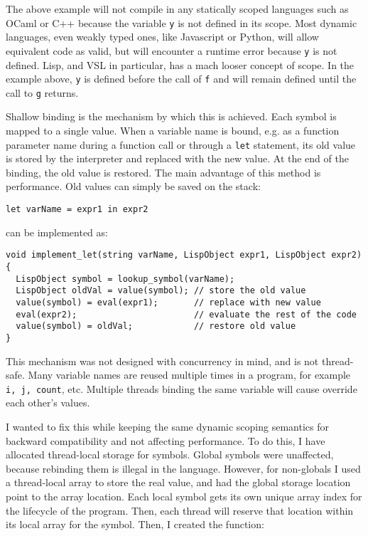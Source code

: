 The above example will not compile in any statically scoped languages such as OCaml or C++
because the variable \texttt{y} is not defined in its scope.
Most dynamic languages, even weakly typed ones, like Javascript or Python, will allow equivalent
code as valid, but will encounter a runtime error because \texttt{y} is not defined.
Lisp, and VSL in particular, has a mach looser concept of scope.
In the example above, \texttt{y} is defined before the call of \texttt{f} and will remain defined until the
call to \texttt{g} returns.

Shallow binding is the mechanism by which this is achieved. Each symbol is mapped to a single value.
When a variable name is bound, e.g. as a function parameter name during a function call or through a
\texttt{let} statement, its old value is stored by the interpreter and replaced with the new value. At the end of the binding,
the old value is restored. The main advantage of this method is performance. Old values can simply be saved
on the stack:
\begin{verbatim}
let varName = expr1 in expr2
\end{verbatim}

can be implemented as:

\begin{verbatim}
void implement_let(string varName, LispObject expr1, LispObject expr2) {
  LispObject symbol = lookup_symbol(varName);
  LispObject oldVal = value(symbol); // store the old value
  value(symbol) = eval(expr1);       // replace with new value
  eval(expr2);                       // evaluate the rest of the code
  value(symbol) = oldVal;            // restore old value
}
\end{verbatim}

This mechanism was not designed with concurrency in mind, and is not thread-safe.
Many variable names are reused multiple times in a program, for example \texttt{i, j, count}, etc.
Multiple threads binding the same variable will cause override each other's values.

I wanted to fix this while keeping the same dynamic scoping semantics for backward compatibility
and not affecting performance. To do this, I have allocated thread-local storage for symbols.
Global symbols were unaffected, because rebinding them is illegal in the language. However,
for non-globals I used a thread-local array to store the real value, and had the global storage
location point to the array location. Each local symbol gets its own unique array index for the lifecycle
of the program. Then, each thread will reserve that location within its local array for the symbol.
Then, I created the function:

